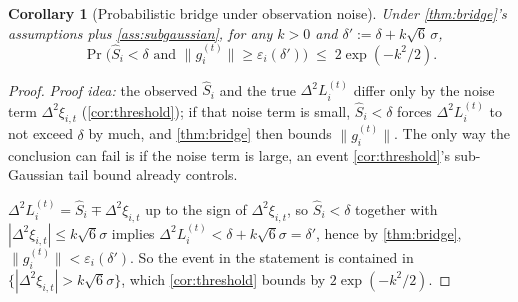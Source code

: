 \documentclass{article}
\theoremstyle{plain}
\newtheorem{corollary}[theorem]{Corollary}
\theoremstyle{definition}
\theoremstyle{remark}
\begin{document}
\begin{corollary}[Probabilistic bridge under observation noise]
\label{cor:bridgeprob}
Under \cref{thm:bridge}'s assumptions plus \cref{ass:subgaussian}, for any $k>0$ and $\delta':=\delta+k\sqrt6\,\sigma$,
\begin{equation}
\Pr\big(\hat S_i<\delta \text{ and } \|g_i^{(t)}\|\ge\varepsilon_i(\delta')\big) \;\le\; 2\exp(-k^2/2).
\end{equation}
\end{corollary}
\begin{proof}
\emph{Proof idea:} the observed $\hat S_i$ and the true $\Delta^2 L_i^{(t)}$ differ only by the noise term $\Delta^2\xi_{i,t}$ (\cref{cor:threshold}); if that noise term is small, $\hat S_i<\delta$ forces $\Delta^2 L_i^{(t)}$ to not exceed $\delta$ by much, and \cref{thm:bridge} then bounds $\|g_i^{(t)}\|$. The only way the conclusion can fail is if the noise term is large, an event \cref{cor:threshold}'s sub-Gaussian tail bound already controls.

$\Delta^2 L_i^{(t)} = \hat S_i \mp \Delta^2\xi_{i,t}$ up to the sign of $\Delta^2\xi_{i,t}$, so $\hat S_i<\delta$ together with $|\Delta^2\xi_{i,t}|\le k\sqrt6\sigma$ implies $\Delta^2 L_i^{(t)} < \delta+k\sqrt6\sigma=\delta'$, hence by \cref{thm:bridge}, $\|g_i^{(t)}\|<\varepsilon_i(\delta')$. So the event in the statement is contained in $\{|\Delta^2\xi_{i,t}|>k\sqrt6\sigma\}$, which \cref{cor:threshold} bounds by $2\exp(-k^2/2)$.
\end{proof}
\end{document}
